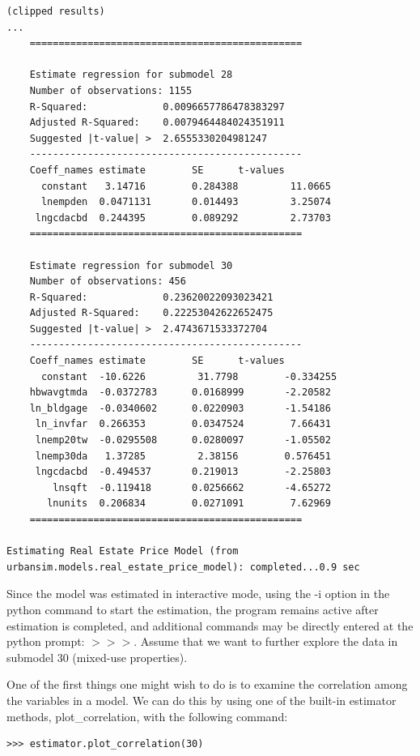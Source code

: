 \begin{lstlisting}
(clipped results)
...
    ===============================================

    Estimate regression for submodel 28
    Number of observations: 1155
    R-Squared:             0.0096657786478383297
    Adjusted R-Squared:    0.0079464484024351911
    Suggested |t-value| >  2.6555330204981247
    -----------------------------------------------
    Coeff_names estimate        SE      t-values
      constant   3.14716        0.284388         11.0665
      lnempden  0.0471131       0.014493         3.25074
     lngcdacbd  0.244395        0.089292         2.73703
    ===============================================

    Estimate regression for submodel 30
    Number of observations: 456
    R-Squared:             0.23620022093023421
    Adjusted R-Squared:    0.22253042622652475
    Suggested |t-value| >  2.4743671533372704
    -----------------------------------------------
    Coeff_names estimate        SE      t-values
      constant  -10.6226         31.7798        -0.334255
    hbwavgtmda  -0.0372783      0.0168999       -2.20582
    ln_bldgage  -0.0340602      0.0220903       -1.54186
     ln_invfar  0.266353        0.0347524        7.66431
     lnemp20tw  -0.0295508      0.0280097       -1.05502
     lnemp30da   1.37285         2.38156        0.576451
     lngcdacbd  -0.494537       0.219013        -2.25803
        lnsqft  -0.119418       0.0256662       -4.65272
       lnunits  0.206834        0.0271091        7.62969
    ===============================================

Estimating Real Estate Price Model (from urbansim.models.real_estate_price_model): completed...0.9 sec
\end{lstlisting}

Since the model was estimated in interactive mode, using the -i option in the python command to start the estimation, the program remains active after estimation is completed, and additional commands may be directly entered at the python prompt: $>>>$.  Assume that we want to further explore the data in submodel 30 (mixed-use properties).  

One of the first things one might wish to do is to examine the correlation among the variables in a model.  We can do this by using one of the built-in estimator methods, plot\_correlation, with the following command:

\begin{lstlisting}
>>> estimator.plot_correlation(30)
\end{lstlisting}

